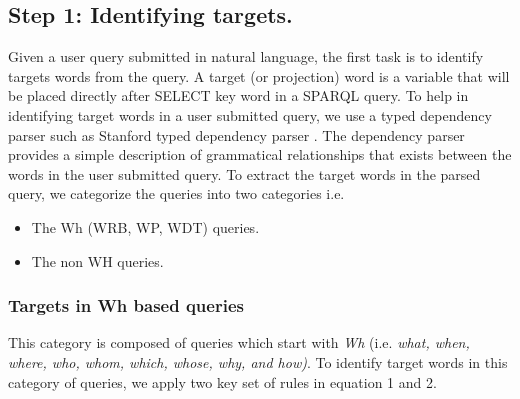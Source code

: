 \documentclass[review]{elsarticle}
\begin{document}
\subsection{Step 1: Identifying targets.}
Given a user query submitted in natural language, the  first task is to identify targets  words from the query. A target (or projection) word  is a variable  that will be placed directly after SELECT key word in a SPARQL query. To help in  identifying  target words  in a  user submitted query, we  use a  typed dependency parser such as Stanford typed dependency parser \citep{Marneffe2015}. The dependency parser provides a simple description of grammatical relationships that exists between the words in the  user submitted query. To extract  the target words in the parsed query, we categorize the queries into two categories i.e.
\begin{itemize}
\item The  Wh (WRB, WP, WDT)  queries.
\item The non WH queries.
\end{itemize}
\subsubsection{ Targets in Wh based queries}
This category is composed of queries which start with \textit{Wh} (i.e. \textit{ what, when, where, who, whom, which, whose, why, and how)}. To identify target words in this category of queries, we apply two key set of rules in equation 1 and 2.
\end{document}
